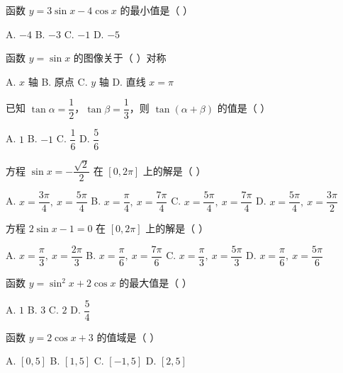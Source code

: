 \documentclass[11pt, a4paper]{article}
\begin{document}
\begin{baitap}[13]
函数 $y = 3\sin x - 4\cos x$ 的最小值是（ ）
\par\vspace{3pt}
\noindent A. $-4$ \quad B. $-3$ \quad C. $-1$ \quad D. $-5$
\end{baitap}

\begin{baitap}[14]
函数 $y = \sin x$ 的图像关于（ ）对称
\par\vspace{3pt}
\noindent A. $x$ 轴 \quad B. 原点 \quad C. $y$ 轴 \quad D. 直线 $x = \pi$
\end{baitap}

\begin{baitap}[15]
已知 $\tan\alpha = \dfrac{1}{2}$，$\tan\beta = \dfrac{1}{3}$，则 $\tan(\alpha + \beta)$ 的值是（ ）
\par\vspace{3pt}
\noindent A. $1$ \quad B. $-1$ \quad C. $\dfrac{1}{6}$ \quad D. $\dfrac{5}{6}$
\end{baitap}

\begin{baitap}[16]
方程 $\sin x = -\dfrac{\sqrt{2}}{2}$ 在 $[0, 2\pi]$ 上的解是（ ）
\par\vspace{3pt}
\noindent A. $x = \dfrac{3\pi}{4},\ x = \dfrac{5\pi}{4}$ \quad B. $x = \dfrac{\pi}{4},\ x = \dfrac{7\pi}{4}$ \quad C. $x = \dfrac{5\pi}{4},\ x = \dfrac{7\pi}{4}$ \quad D. $x = \dfrac{5\pi}{4},\ x = \dfrac{3\pi}{2}$
\end{baitap}

\begin{baitap}[17]
方程 $2\sin x - 1 = 0$ 在 $[0, 2\pi]$ 上的解是（ ）
\par\vspace{3pt}
\noindent A. $x = \dfrac{\pi}{3},\ x = \dfrac{2\pi}{3}$ \quad B. $x = \dfrac{\pi}{6},\ x = \dfrac{7\pi}{6}$ \quad C. $x = \dfrac{\pi}{3},\ x = \dfrac{5\pi}{3}$ \quad D. $x = \dfrac{\pi}{6},\ x = \dfrac{5\pi}{6}$
\end{baitap}

\begin{baitap}[18]
函数 $y = \sin^2 x + 2\cos x$ 的最大值是（ ）
\par\vspace{3pt}
\noindent A. $1$ \quad B. $3$ \quad C. $2$ \quad D. $\dfrac{5}{4}$
\end{baitap}

\begin{baitap}[19]
函数 $y = 2\cos x + 3$ 的值域是（ ）
\par\vspace{3pt}
\noindent A. $[0,5]$ \quad B. $[1,5]$ \quad C. $[-1,5]$ \quad D. $[2,5]$
\end{baitap}
\end{document}
